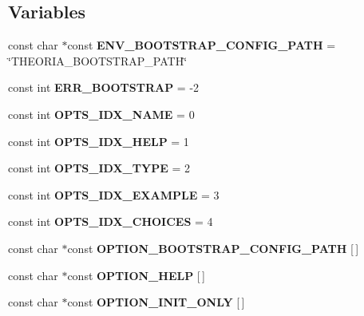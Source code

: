 \subsection*{Variables}
\begin{DoxyCompactItemize}
\item 
\mbox{\label{namespacetheoria_a2a959c9e66a0135d5f99332642f6815e}} 
const char $\ast$const {\bfseries E\+N\+V\+\_\+\+B\+O\+O\+T\+S\+T\+R\+A\+P\+\_\+\+C\+O\+N\+F\+I\+G\+\_\+\+P\+A\+TH} = \char`\"{}T\+H\+E\+O\+R\+I\+A\+\_\+\+B\+O\+O\+T\+S\+T\+R\+A\+P\+\_\+\+P\+A\+TH\char`\"{}
\item 
\mbox{\label{namespacetheoria_a4427bfe4c1771361b961393d52ae8cfd}} 
const int {\bfseries E\+R\+R\+\_\+\+B\+O\+O\+T\+S\+T\+R\+AP} = -\/2
\item 
\mbox{\label{namespacetheoria_a34f7269de13b8f576a72afc12e59a880}} 
const int {\bfseries O\+P\+T\+S\+\_\+\+I\+D\+X\+\_\+\+N\+A\+ME} = 0
\item 
\mbox{\label{namespacetheoria_a9133a4566be1cd42d5d082a923054c79}} 
const int {\bfseries O\+P\+T\+S\+\_\+\+I\+D\+X\+\_\+\+H\+E\+LP} = 1
\item 
\mbox{\label{namespacetheoria_ac650aebc62d28bc7dcc33e589b0731ef}} 
const int {\bfseries O\+P\+T\+S\+\_\+\+I\+D\+X\+\_\+\+T\+Y\+PE} = 2
\item 
\mbox{\label{namespacetheoria_a667f962fdb5023b71417fc4d0d313159}} 
const int {\bfseries O\+P\+T\+S\+\_\+\+I\+D\+X\+\_\+\+E\+X\+A\+M\+P\+LE} = 3
\item 
\mbox{\label{namespacetheoria_a2548c16ea9d8d9cfcdb25060c745e188}} 
const int {\bfseries O\+P\+T\+S\+\_\+\+I\+D\+X\+\_\+\+C\+H\+O\+I\+C\+ES} = 4
\item 
const char $\ast$const {\bfseries O\+P\+T\+I\+O\+N\+\_\+\+B\+O\+O\+T\+S\+T\+R\+A\+P\+\_\+\+C\+O\+N\+F\+I\+G\+\_\+\+P\+A\+TH} \mbox{[}$\,$\mbox{]}
\item 
const char $\ast$const {\bfseries O\+P\+T\+I\+O\+N\+\_\+\+H\+E\+LP} \mbox{[}$\,$\mbox{]}
\item 
const char $\ast$const {\bfseries O\+P\+T\+I\+O\+N\+\_\+\+I\+N\+I\+T\+\_\+\+O\+N\+LY} \mbox{[}$\,$\mbox{]}

\end{DoxyCompactItemize}
